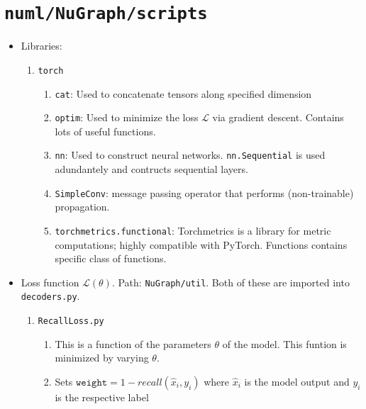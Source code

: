 \section{\texttt{numl/NuGraph/scripts}}

\begin{itemize}
    \item Libraries:
        \begin{enumerate}
            \item \texttt{torch}
                \begin{enumerate}
                    \item \texttt{cat}: Used to concatenate tensors along specified dimension
                    \item \texttt{optim}: Used to minimize the loss $\mathcal{L}$ via gradient descent. Contains lots of useful functions.
                    \item \texttt{nn}: Used to construct neural networks. \texttt{nn.Sequential} is used adundantely and contructs sequential layers.

                    \item \texttt{SimpleConv}: message passing operator that performs (non-trainable) propagation.
                    
                    \item \texttt{torchmetrics.functional}: Torchmetrics is a library for metric computations; highly compatible with PyTorch. Functions contains specific class of functions.
                \end{enumerate}
        \end{enumerate}
        
    \item Loss function $\mathcal{L}(\theta)$. Path: \texttt{NuGraph/util}. Both of these are imported into \texttt{decoders.py}.
    \begin{enumerate}
        \item \texttt{RecallLoss.py}
            \begin{enumerate}
                \item This is a function of the parameters $\theta$ of the model. This funtion is minimized by varying $\theta$.
                
                \item Sets $\texttt{weight} = 1 - recall(\hat{x}_i, y_i)$ where $\hat{x}_i$ is the model output and $y_i$ is the respective label
                

\end{enumerate}
\end{enumerate}
\end{itemize}
